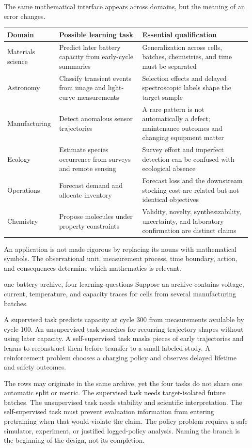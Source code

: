 The same mathematical interface appears across domains, but the meaning of an
error changes.

\begin{tabularx}{\textwidth}{@{}>{\raggedright\arraybackslash}p{}>{\raggedright\arraybackslash}p{}>{\raggedright\arraybackslash}X@{}}
\toprule
Domain & Possible learning task & Essential qualification \\
\midrule
Materials science & Predict later battery capacity from early-cycle summaries
& Generalization across cells, batches, chemistries, and time must be separated \\
Astronomy & Classify transient events from image and light-curve measurements
& Selection effects and delayed spectroscopic labels shape the target sample \\
Manufacturing & Detect anomalous sensor trajectories & A rare pattern is not
automatically a defect; maintenance outcomes and changing equipment matter \\
Ecology & Estimate species occurrence from surveys and remote sensing & Survey
effort and imperfect detection can be confused with ecological absence \\
Operations & Forecast demand and allocate inventory & Forecast loss and the
downstream stocking cost are related but not identical objectives \\
Chemistry & Propose molecules under property constraints & Validity, novelty,
synthesizability, uncertainty, and laboratory confirmation are distinct claims \\
\bottomrule
\end{tabularx}

An application is not made rigorous by replacing its nouns with mathematical
symbols. The observational unit, measurement process, time boundary, action,
and consequences determine which mathematics is relevant.

\begin{workedexample}{one battery archive, four learning questions}
Suppose an archive contains voltage, current, temperature, and capacity traces
for cells from several manufacturing batches.

A supervised task predicts capacity at cycle 300 from measurements available by
cycle 100. An unsupervised task searches for recurring trajectory shapes without
using later capacity. A self-supervised task masks pieces of early trajectories
and learns to reconstruct them before transfer to a small labeled study. A
reinforcement problem chooses a charging policy and observes delayed lifetime
and safety outcomes.

The rows may originate in the same archive, yet the four tasks do not share one
automatic split or metric. The supervised task needs target-isolated future
batches. The unsupervised task needs stability and scientific interpretation.
The self-supervised task must prevent evaluation information from entering
pretraining when that would violate the claim. The policy problem requires a
safe simulator, experiment, or justified logged-policy analysis. Naming the
branch is the beginning of the design, not its completion.
\end{workedexample}

